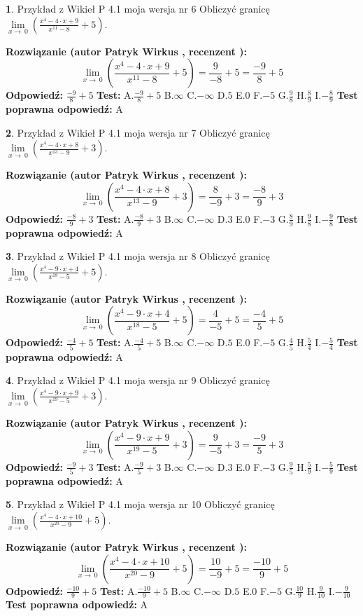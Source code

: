 \documentclass[12pt, a4paper]{article}
\theoremstyle{definition} %
\newtheorem{zad}{}
\newcommand{\zadStart}[1]{\begin{zad}#1\newline}
\newcommand{\zadStop}{\end{zad}}
\newcommand{\rozwStart}[2]{\noindent \textbf{Rozwiązanie (autor #1 , recenzent #2): }\newline}
\newcommand{\rozwStop}{\newline}
\newcommand{\odpStart}{\noindent \textbf{Odpowiedź:}\newline}
\newcommand{\odpStop}{\newline}
\newcommand{\testStart}{\noindent \textbf{Test:}\newline}
\newcommand{\testStop}{\newline}
\newcommand{\kluczStart}{\noindent \textbf{Test poprawna odpowiedź:}\newline}
\newcommand{\kluczStop}{\newline}
\begin{document}
\zadStart{Przykład z Wikieł P 4.1 moja wersja nr 6}
Obliczyć granicę $\lim\limits_{x\to\ 0}(\frac{x^{4}-4 \cdot x +9}{x^{11}-8}+5)$.
\zadStop
\rozwStart{Patryk Wirkus}{}
$$\lim\limits_{x\to\ 0}(\frac{x^{4}-4 \cdot x +9}{x^{11}-8}+5)=\frac{9}{-8}+5=\frac{-9}{8}+5$$
\rozwStop
\odpStart
$\frac{-9}{8}+5$
\odpStop
\testStart
A.$\frac{-9}{8}+5$
B.$\infty$
C.$-\infty$
D.$5$
E.$0$
F.$-5$
G.$\frac{9}{8}$
H.$\frac{8}{9}$
I.$-\frac{8}{9}$
\testStop
\kluczStart
A
\kluczStop



\zadStart{Przykład z Wikieł P 4.1 moja wersja nr 7}
Obliczyć granicę $\lim\limits_{x\to\ 0}(\frac{x^{4}-4 \cdot x +8}{x^{13}-9}+3)$.
\zadStop
\rozwStart{Patryk Wirkus}{}
$$\lim\limits_{x\to\ 0}(\frac{x^{4}-4 \cdot x +8}{x^{13}-9}+3)=\frac{8}{-9}+3=\frac{-8}{9}+3$$
\rozwStop
\odpStart
$\frac{-8}{9}+3$
\odpStop
\testStart
A.$\frac{-8}{9}+3$
B.$\infty$
C.$-\infty$
D.$3$
E.$0$
F.$-3$
G.$\frac{8}{9}$
H.$\frac{9}{8}$
I.$-\frac{9}{8}$
\testStop
\kluczStart
A
\kluczStop



\zadStart{Przykład z Wikieł P 4.1 moja wersja nr 8}
Obliczyć granicę $\lim\limits_{x\to\ 0}(\frac{x^{4}-9 \cdot x +4}{x^{18}-5}+5)$.
\zadStop
\rozwStart{Patryk Wirkus}{}
$$\lim\limits_{x\to\ 0}(\frac{x^{4}-9 \cdot x +4}{x^{18}-5}+5)=\frac{4}{-5}+5=\frac{-4}{5}+5$$
\rozwStop
\odpStart
$\frac{-4}{5}+5$
\odpStop
\testStart
A.$\frac{-4}{5}+5$
B.$\infty$
C.$-\infty$
D.$5$
E.$0$
F.$-5$
G.$\frac{4}{5}$
H.$\frac{5}{4}$
I.$-\frac{5}{4}$
\testStop
\kluczStart
A
\kluczStop



\zadStart{Przykład z Wikieł P 4.1 moja wersja nr 9}
Obliczyć granicę $\lim\limits_{x\to\ 0}(\frac{x^{4}-9 \cdot x +9}{x^{19}-5}+3)$.
\zadStop
\rozwStart{Patryk Wirkus}{}
$$\lim\limits_{x\to\ 0}(\frac{x^{4}-9 \cdot x +9}{x^{19}-5}+3)=\frac{9}{-5}+3=\frac{-9}{5}+3$$
\rozwStop
\odpStart
$\frac{-9}{5}+3$
\odpStop
\testStart
A.$\frac{-9}{5}+3$
B.$\infty$
C.$-\infty$
D.$3$
E.$0$
F.$-3$
G.$\frac{9}{5}$
H.$\frac{5}{9}$
I.$-\frac{5}{9}$
\testStop
\kluczStart
A
\kluczStop



\zadStart{Przykład z Wikieł P 4.1 moja wersja nr 10}
Obliczyć granicę $\lim\limits_{x\to\ 0}(\frac{x^{4}-4 \cdot x +10}{x^{20}-9}+5)$.
\zadStop
\rozwStart{Patryk Wirkus}{}
$$\lim\limits_{x\to\ 0}(\frac{x^{4}-4 \cdot x +10}{x^{20}-9}+5)=\frac{10}{-9}+5=\frac{-10}{9}+5$$
\rozwStop
\odpStart
$\frac{-10}{9}+5$
\odpStop
\testStart
A.$\frac{-10}{9}+5$
B.$\infty$
C.$-\infty$
D.$5$
E.$0$
F.$-5$
G.$\frac{10}{9}$
H.$\frac{9}{10}$
I.$-\frac{9}{10}$
\testStop
\kluczStart
A
\kluczStop
\end{document}
